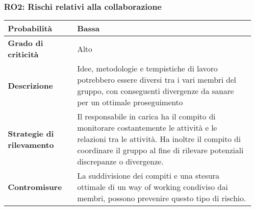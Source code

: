 \noindent\begin{minipage}{\textwidth}
\subsubsection{RO2: Rischi relativi alla collaborazione}
    
\bgroup
\begin{adjustwidth}{-0.5cm}{-0.5cm}
    \begin{longtable}{P{4.5cm}|>{\justifying \arraybackslash}P{9cm}}

        \textbf{Probabilità} & Bassa \\
        \hline
        \textbf{Grado di criticità} & Alto \\
        \hline
        \textbf{Descrizione} & Idee, metodologie e tempistiche di lavoro potrebbero essere diversi tra i vari membri del gruppo, con conseguenti divergenze da sanare per un ottimale proseguimento \\
        \hline
        \textbf{Strategie di rilevamento} &  Il responsabile in carica ha il compito di monitorare costantemente le attività e le relazioni tra le attività. Ha inoltre il compito di coordinare il gruppo al fine di rilevare potenziali discrepanze o divergenze. \\
        \hline
        \textbf{Contromisure} & La suddivisione dei compiti e una stesura ottimale di un way of working condiviso dai membri, possono prevenire questo tipo di rischio.
    \end{longtable}
\end{adjustwidth}
\egroup
\end{minipage}